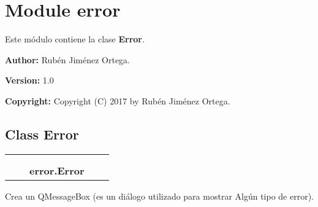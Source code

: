 %
%
%


\section{Module error}

    \label{error}
Este módulo contiene la clase \textbf{Error}.

\textbf{Author:} Rubén Jiménez Ortega.



\textbf{Version:} 1.0



\textbf{Copyright:} Copyright (C) 2017 by Rubén Jiménez Ortega.





\subsection{Class Error}

    \label{error:Error}
\begin{tabular}{cccccc}
\multicolumn{2}{r}{\settowidth{\BCL}{??-3}\multirow{2}{\BCL}{??-3}}
&&
  \\\cline{3-3}
  &&\multicolumn{1}{c|}{}
&&
  \\
&&\multicolumn{2}{l}{\textbf{error.Error}}
\end{tabular}

Crea un QMessageBox (es un diálogo utilizado para mostrar Algún tipo de 
error).



